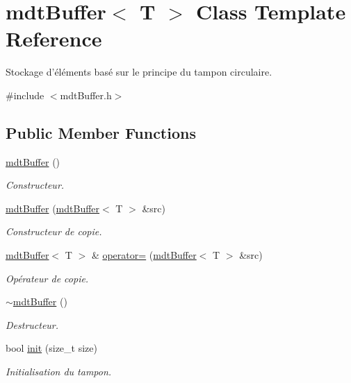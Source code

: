 \hypertarget{classmdt_buffer}{
\section{mdtBuffer$<$ T $>$ Class Template Reference}
\label{classmdt_buffer}
}


Stockage d'éléments basé sur le principe du tampon circulaire.  




{\ttfamily \#include $<$mdtBuffer.h$>$}

\subsection*{Public Member Functions}
\begin{DoxyCompactItemize}
\item 
\hyperlink{classmdt_buffer_a51bc78e5a9fc926c7b898160c6a2faa3}{mdtBuffer} ()
\begin{DoxyCompactList}\small\item\em Constructeur. \end{DoxyCompactList}\item 
\hyperlink{classmdt_buffer_a4d6c140c02257fffb37016d019e412cf}{mdtBuffer} (\hyperlink{classmdt_buffer}{mdtBuffer}$<$ T $>$ \&src)
\begin{DoxyCompactList}\small\item\em Constructeur de copie. \end{DoxyCompactList}\item 
\hyperlink{classmdt_buffer}{mdtBuffer}$<$ T $>$ \& \hyperlink{classmdt_buffer_aba9a31eb29a39a2721205f13f80c1d8d}{operator=} (\hyperlink{classmdt_buffer}{mdtBuffer}$<$ T $>$ \&src)
\begin{DoxyCompactList}\small\item\em Opérateur de copie. \end{DoxyCompactList}\item 
\hyperlink{classmdt_buffer_a54de4cebee3cab7b8c1b86bfc3bdad4f}{$\sim$mdtBuffer} ()
\begin{DoxyCompactList}\small\item\em Destructeur. \end{DoxyCompactList}\item 
bool \hyperlink{classmdt_buffer_a9d081b06f666fec3ff6e12ec94b2a4fd}{init} (size\_\-t size)
\begin{DoxyCompactList}\small\item\em Initialisation du tampon. \end{DoxyCompactList}\item 

\end{DoxyCompactItemize}
